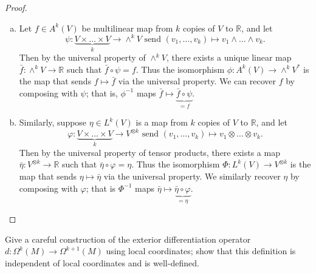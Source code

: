 \documentclass{article}
\newenvironment{problem}[2][Problem]{\begin{trivlist}
\item[\hskip \labelsep {\bfseries #1}\hskip \labelsep {\bfseries #2.}]}{\end{trivlist}}
\begin{document}
\begin{proof} \text{} \\
  \begin{enumerate}[(a)]
    \item Let $f \in A^k(V)$ be multilinear map from $k$ copies of $V$ to $\mathbb{R}$,
    and let \[
      \psi\colon \underbrace{V \times \hdots \times V}_{k} \rightarrow \wedge^kV
      \text{ send }
      (v_1, \hdots, v_k) \mapsto v_1 \wedge \hdots \wedge v_k.
    \] Then by the
    universal property of $\wedge^kV$, there exists a unique linear map
    $\bar{f}\colon \wedge^kV \rightarrow \mathbb{R}$ such that
    $\bar{f} \circ \psi = f$. Thus the isomorphism
    $\phi: A^k(V) \rightarrow \wedge^kV^*$ is the map that sends
    $f \mapsto \bar{f}$ via the universal property. We can recover $f$ by
    composing with $\psi$; that is, $\phi^{-1}$ maps
    $\bar{f} \mapsto \underbrace{\bar{f} \circ \psi}_{=f}$.
    \item Similarly, suppose $\eta \in L^k(V)$ is a map from $k$ copies of $V$ to
    $\mathbb{R}$, and let \[
      \varphi: \underbrace{V \times \hdots \times V}_k \rightarrow V^{\otimes k}
      \text{ send }
      (v_1, \hdots, v_k) \mapsto v_1 \otimes \hdots \otimes v_k.
    \] Then by the universal property of tensor products, there exists a map
    $\bar{\eta}: V^{\otimes k} \rightarrow \mathbb{R}$ such that
    $\bar{\eta} \circ \varphi = \eta$. Thus the isomorphism
    $\Phi: L^k(V)\rightarrow V^{\otimes k}$ is the map that sends
    $\eta \mapsto \bar\eta$ via the universal property. We similarly recover
    $\eta$ by composing with $\varphi$; that is $\Phi^{-1}$ maps
    $\bar\eta \mapsto \underbrace{\bar\eta\circ\varphi}_{=\eta}$.
  \end{enumerate}
\end{proof}

\pagebreak

\begin{problem}{4}
  Give a careful construction of the exterior differentiation operator
  $d\colon \Omega^k(M) \rightarrow \Omega^{k+1}(M)$ using local coordinates;
  show that this definition is independent of local coordinates and is
  well-defined.
\end{problem}
\end{document}
